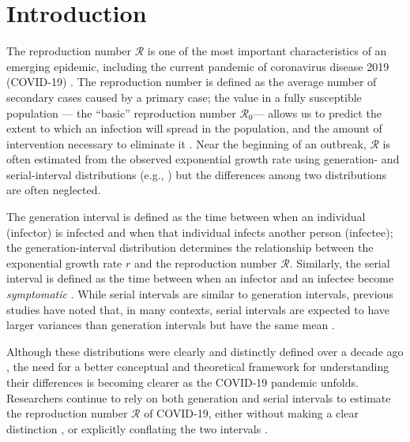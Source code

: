 \documentclass[12pt]{article}
\newcommand{\Rx}[1]{\ensuremath{{\mathcal R}_{#1}}\xspace}
\newcommand{\Ro}{\Rx{0}}
\newcommand{\RR}{\ensuremath{{\mathcal R}}\xspace}
\begin{document}
\pagebreak

\section{Introduction}

The reproduction number \RR is one of the most important characteristics of an emerging epidemic, including the current pandemic of coronavirus disease 2019 (COVID-19) \citep{majumder2020early}.
The reproduction number is defined as the average number of secondary cases caused by a primary case;
the value in a fully susceptible population --- the ``basic'' reproduction number \Ro --- allows us to predict the extent to which an infection will spread in the population, and the amount of intervention necessary to eliminate it \citep{anderson1991infectious}.
Near the beginning of an outbreak, \RR is often estimated from the observed exponential growth rate using generation- and serial-interval distributions (e.g., \cite{wallinga2007generation, fraser2009pandemic, hampson2009transmission, chunara2012social, chowell2014west, du2020serial, jung2020real}) but the differences among two distributions are often neglected.

The generation interval is defined as the time between when an individual (infector) is infected and when that individual infects another person (infectee);
the generation-interval distribution determines the relationship between the exponential growth rate $r$ and the reproduction number \RR \citep{anderson1991infectious, ferguson2005strategies, wallinga2007generation}.
Similarly, the serial interval is defined as the time between when an infector and an infectee become \emph{symptomatic} \citep{svensson2007note}.
While serial intervals are similar to generation intervals, previous studies have noted that, in many contexts, serial intervals are expected to have larger variances than generation intervals but have the same mean \citep{svensson2007note,klinkenberg2011correlation,te2013estimating,champredon2018equivalence}.

Although these distributions were clearly and distinctly defined over a decade ago \citep{svensson2007note}, 
the need for a better conceptual and theoretical framework for understanding their differences is becoming clearer as the COVID-19 pandemic unfolds.
Researchers continue to rely on both generation and serial intervals to estimate the reproduction number \RR of COVID-19, either without making a clear distinction \citep{tempvar,du2020serial,he2020temporal,wu2020nowcasting,zhao2020serial}, or explicitly conflating the two intervals
\citep{anderson2020will,hellewell2020feasibility}.
\end{document}

